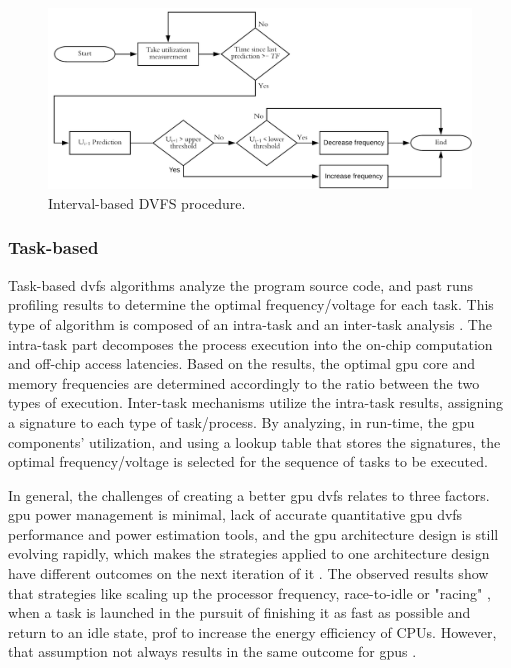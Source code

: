 \begin{figure}[htb]
  \centering
  \includegraphics[width=\textwidth]{Figures/Background/DVFSprogram.png}
  \caption{Interval-based DVFS procedure.}
  \label{fig:DVFSprocedure}
\end{figure}

\subsubsection{Task-based}

Task-based \acrshort{dvfs} algorithms analyze the program source code, and past runs profiling results to determine the optimal frequency/voltage for each task. This type of algorithm is composed of an intra-task and an inter-task analysis \cite{noauthor_time_nodate}. The intra-task part decomposes the process execution into the on-chip computation and off-chip access latencies. Based on the results,  the optimal \acrshort{gpu} core and memory frequencies are determined accordingly to the ratio between the two types of execution. Inter-task mechanisms utilize the intra-task results, assigning a signature to each type of task/process. By analyzing, in run-time, the \acrshort{gpu} components' utilization, and using a lookup table that stores the signatures, the optimal frequency/voltage is selected for the sequence of tasks to be executed.

\bigskip
In general, the challenges of creating a better \acrshort{gpu} \acrshort{dvfs} relates to three factors. \acrshort{gpu} power management is minimal, lack of accurate quantitative \acrshort{gpu} \acrshort{dvfs} performance and power estimation tools, and the \acrshort{gpu} architecture design is still evolving rapidly, which makes the strategies applied to one architecture design have different outcomes on the next iteration of it \cite{mei_survey_2016}. The observed results show that strategies like scaling up the processor frequency, race-to-idle  \cite{hoffmann_racing_2013} or "racing" \cite{kim_racing_2015}, when a task is launched in the pursuit of finishing it as fast as possible and return to an idle state, prof to increase the energy efficiency of CPUs. However, that assumption not always results in the same outcome for \acrshort{gpu}s \cite{kim_racing_2015}. 

